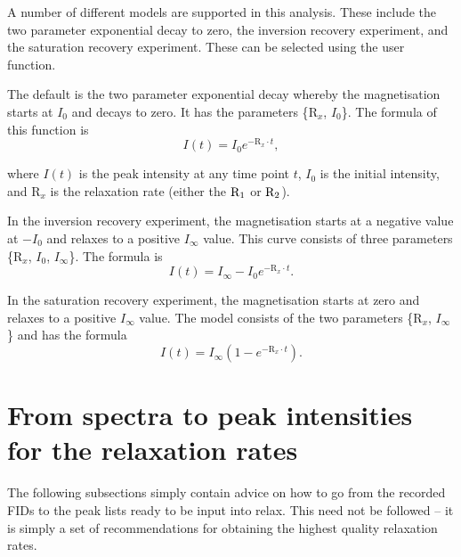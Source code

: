 A number of different models are supported in this analysis.
These include the two parameter exponential decay to zero, the inversion recovery experiment, and the saturation recovery experiment.
These can be selected using the  user function.

The default is the two parameter exponential decay whereby the magnetisation starts at $I_0$ and decays to zero.
It has the parameters \{$\mathrm{R}_x$, $I_0$\}.
The formula of this function is
\begin{equation}
  I(t) = I_0 e^{-\mathrm{R}_x \cdot t} ,
\end{equation}

\noindent where $I(t)$ is the peak intensity at any time point $t$, $I_0$ is the initial intensity, and $\mathrm{R}_x$ is the relaxation rate (either the $\mathrm{R}_1$ or $\mathrm{R}_2$).

In the inversion recovery experiment, the magnetisation starts at a negative value at $-I_0$ and relaxes to a positive $I_{\infty}$ value.
This curve consists of three parameters \{$\mathrm{R}_x$, $I_0$, $I_{\infty}$\}.
The formula is
\begin{equation}
  I(t) = I_{\infty} - I_0 e^{-\mathrm{R}_x \cdot t} .
\end{equation}

In the saturation recovery experiment, the magnetisation starts at zero and relaxes to a positive $I_{\infty}$ value.
The model consists of the two parameters \{$\mathrm{R}_x$, $I_{\infty}$\} and has the formula
\begin{equation}
  I(t) = I_{\infty} \left( 1 - e^{-\mathrm{R}_x \cdot t} \right) .
\end{equation}




\section{From spectra to peak intensities for the relaxation rates} \label{sect: spectra to intensities}

The following subsections simply contain advice on how to go from the recorded FIDs to the peak lists ready to be input into relax.
This need not be followed -- it is simply a set of recommendations for obtaining the highest quality relaxation rates.



